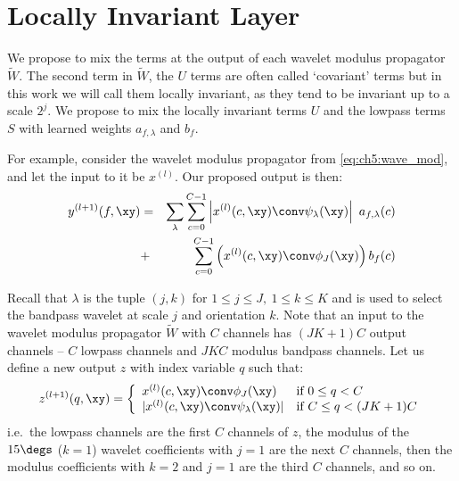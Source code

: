 \section{Locally Invariant Layer} \label{sec:ch5:method}
We propose to mix the terms at the output of each wavelet modulus propagator
$\tilde{W}$. The second term in $\tilde{W}$, the $U$ terms are often called `covariant' terms but
in this work we will call them locally invariant, as they tend to be invariant up to a
scale $2^j$. We propose to mix the locally invariant terms $U$ and the
lowpass terms $S$ with learned weights $a_{f,\lambda}$ and $b_f$. 


For example,
consider the wavelet modulus propagator from \eqref{eq:ch5:wave_mod},
and let the input to it be $x^{(l)}$. Our proposed output is then:
%
\begin{eqnarray} \label{eq:ch5:comb1}
  y^{(l+1)}(f, \xy) & = & \sum_{\lambda} \sum_{c=0}^{C-1} \left|x^{(l)}(c, \xy)\conv \psi_\lambda(\xy)\right|\ a_{f, \lambda}(c) \nonumber \\
                    & + & \sum_{c=0}^{C-1} \left(x^{(l)}(c, \xy) \conv \phi_J(\xy)\right) b_f(c)
  \label{eq:ch5:layer}
\end{eqnarray}

Recall that $\lambda$ is the tuple $(j, k)$ for  $1 \leq j \leq J,\ 1 \leq k \leq K$
and is used to select the bandpass wavelet at scale $j$ and orientation $k$.
Note that an input to the wavelet modulus propagator $\tilde{W}$ with $C$ channels
has $(JK+1)C$ output channels -- $C$ lowpass channels and $JKC$ modulus bandpass
channels. Let us define a new output $z$ with index variable $q$ such that:
%
\begin{equation}
  z^{(l+1)}(q, \xy) =  \left\{
    \begin{array}{ll}
      x^{(l)}(c, \xy) \conv \phi_J(\xy) & \mbox{if } 0 \leq q < C \\
      |x^{(l)}(c, \xy)\conv \psi_\lambda(\xy)| & \mbox{if }	C \leq q < (JK+1)C
    \end{array}
    \right. \label{eq:ch5:z}
\end{equation}
i.e.\ the lowpass channels are the first $C$ channels of $z$, the modulus of the
$15\degs$ ($k=1$) wavelet coefficients with $j=1$ are the next $C$ channels,
then the modulus coefficients with $k=2$ and $j=1$ are the third $C$ channels,
and so on.

